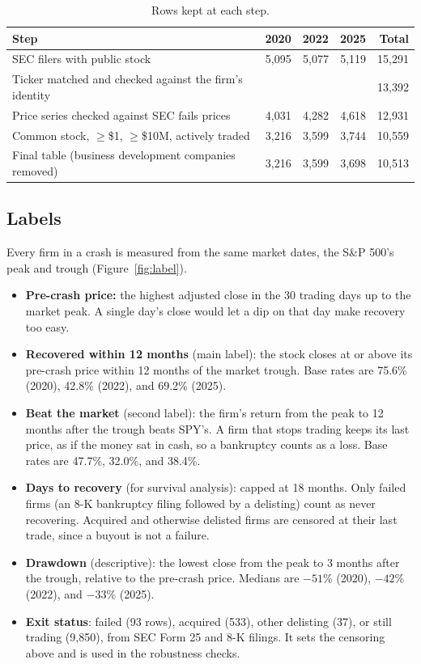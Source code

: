 \documentclass[11pt]{article}
\begin{document}
\begin{table}[h]
\centering\small
\caption{Rows kept at each step.}
\label{tab:funnel}
\begin{tabular}{lrrrr}
\toprule
Step & 2020 & 2022 & 2025 & Total \\
\midrule
SEC filers with public stock & 5,095 & 5,077 & 5,119 & 15,291 \\
Ticker matched and checked against the firm's identity & & & & 13,392 \\
Price series checked against SEC fails prices & 4,031 & 4,282 & 4,618 & 12,931 \\
Common stock, $\geq$\$1, $\geq$\$10M, actively traded & 3,216 & 3,599 & 3,744 & 10,559 \\
Final table (business development companies removed) & 3,216 & 3,599 & 3,698 & 10,513 \\
\bottomrule
\end{tabular}
\end{table}

\subsection{Labels}
Every firm in a crash is measured from the same market dates, the S\&P 500's peak and trough (Figure~\ref{fig:label}).
\begin{itemize}
  \item \textbf{Pre-crash price:} the highest adjusted close in the 30 trading days up to the market peak. A single day's close would let a dip on that day make recovery too easy.
  \item \textbf{Recovered within 12 months} (main label): the stock closes at or above its pre-crash price within 12 months of the market trough. Base rates are 75.6\% (2020), 42.8\% (2022), and 69.2\% (2025).
  \item \textbf{Beat the market} (second label): the firm's return from the peak to 12 months after the trough beats SPY's. A firm that stops trading keeps its last price, as if the money sat in cash, so a bankruptcy counts as a loss. Base rates are 47.7\%, 32.0\%, and 38.4\%.
  \item \textbf{Days to recovery} (for survival analysis): capped at 18 months. Only failed firms (an 8-K bankruptcy filing followed by a delisting) count as never recovering. Acquired and otherwise delisted firms are censored at their last trade, since a buyout is not a failure.
  \item \textbf{Drawdown} (descriptive): the lowest close from the peak to 3 months after the trough, relative to the pre-crash price. Medians are $-51\%$ (2020), $-42\%$ (2022), and $-33\%$ (2025).
  \item \textbf{Exit status}: failed (93 rows), acquired (533), other delisting (37), or still trading (9,850), from SEC Form 25 and 8-K filings. It sets the censoring above and is used in the robustness checks.
\end{itemize}
\end{document}
